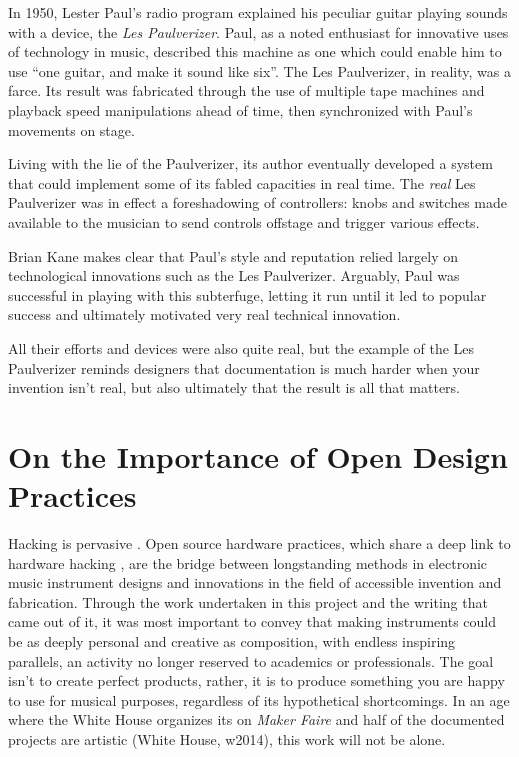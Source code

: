 In 1950, Lester Paul's radio program explained his peculiar guitar playing sounds with a device, the \emph{Les Paulverizer}. Paul, as a noted enthusiast for innovative uses of technology in music, described this machine as one which could enable him to use ``one guitar, and make it sound like six''. The Les Paulverizer, in reality, was a farce. Its result was fabricated through the use of multiple tape machines and playback speed manipulations ahead of time, then synchronized with Paul's movements on stage. 

Living with the lie of the Paulverizer, its author eventually developed a system that could implement some of its fabled capacities in real time. The \emph{real} Les Paulverizer was in effect a foreshadowing of controllers: knobs and switches made available to the musician to send controls offstage and trigger various effects\citep{kane2014}. 

Brian Kane makes clear that Paul's style and reputation relied largely on technological innovations such as the Les Paulverizer. Arguably, Paul was successful in playing with this subterfuge, letting it run until it led to popular success and ultimately motivated very real technical innovation.

 All their efforts and devices were also quite real, but the example of the Les Paulverizer reminds designers that documentation is much harder when your invention isn't real, but also ultimately that the result is all that matters. 

\section{On the Importance of Open Design Practices}

Hacking is pervasive \citep{paradiso2008}. Open source hardware practices, which share a deep link to hardware hacking \citep{williams2012}, are the bridge between longstanding methods in electronic music instrument designs and innovations in the field of accessible invention and fabrication. Through the work undertaken in this project and the writing that came out of it, it was most important to convey that making instruments could be as deeply personal and creative as composition, with endless inspiring parallels, an activity no longer reserved to academics or professionals. The goal isn't to create perfect products, rather, it is to produce something you are happy to use for musical purposes, regardless of its hypothetical shortcomings. In an age where the White House organizes its on \textit{Maker Faire} and half of the documented projects are artistic (White House, w2014), this work will not be alone.

